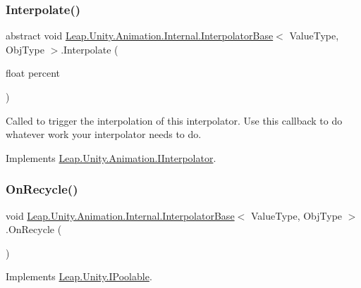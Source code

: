 \subsubsection{\texorpdfstring{Interpolate()}{Interpolate()}}
{\footnotesize\ttfamily abstract void \mbox{\hyperlink{class_leap_1_1_unity_1_1_animation_1_1_internal_1_1_interpolator_base}{Leap.\+Unity.\+Animation.\+Internal.\+Interpolator\+Base}}$<$ Value\+Type, Obj\+Type $>$.Interpolate (\begin{DoxyParamCaption}\item[{float}]{percent }\end{DoxyParamCaption})\hspace{0.3cm}{\ttfamily [pure virtual]}}



Called to trigger the interpolation of this interpolator. Use this callback to do whatever work your interpolator needs to do. 



Implements \mbox{\hyperlink{interface_leap_1_1_unity_1_1_animation_1_1_i_interpolator_a4ddd3ea9f35d3f2568921ad2f1112869}{Leap.\+Unity.\+Animation.\+I\+Interpolator}}.

\mbox{\label{class_leap_1_1_unity_1_1_animation_1_1_internal_1_1_interpolator_base_a2721fd11c2638b2f02792c3a73816346}} 
\subsubsection{\texorpdfstring{OnRecycle()}{OnRecycle()}}
{\footnotesize\ttfamily void \mbox{\hyperlink{class_leap_1_1_unity_1_1_animation_1_1_internal_1_1_interpolator_base}{Leap.\+Unity.\+Animation.\+Internal.\+Interpolator\+Base}}$<$ Value\+Type, Obj\+Type $>$.On\+Recycle (\begin{DoxyParamCaption}{ }\end{DoxyParamCaption})}



Implements \mbox{\hyperlink{interface_leap_1_1_unity_1_1_i_poolable_ad509738b2480f85d435b41d05d172bfe}{Leap.\+Unity.\+I\+Poolable}}.



